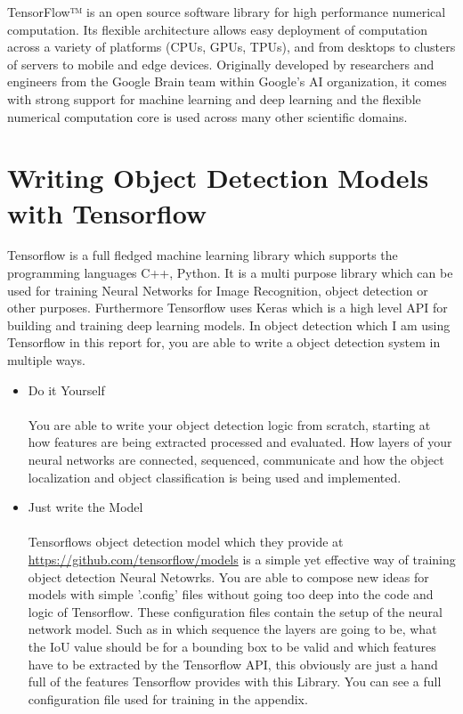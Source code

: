 
TensorFlow™ is an open source software library for high performance numerical computation. Its flexible architecture allows easy deployment
of computation across a variety of platforms (CPUs, GPUs, TPUs), and from desktops to clusters of servers to mobile and edge devices.
Originally developed by researchers and engineers from the Google Brain team within Google’s AI organization, it comes with strong support
for machine learning and deep learning and the flexible numerical computation core is used across many other scientific
domains.\cite{tensorflow}

\section{Writing Object Detection Models with Tensorflow}\label{train-with-tensorflow}
Tensorflow is a full fledged machine learning library which supports the programming languages C++, Python. It is a multi purpose library
which can be used for training Neural Networks for Image Recognition, object detection or other purposes. Furthermore Tensorflow uses
Keras which is a high level API for building and training deep learning models. In object detection which I am using Tensorflow in this
report for, you are able to write a object detection system in multiple ways.
\begin{itemize}
    \item Do it Yourself \\ \\
        You are able to write your object detection logic from scratch, starting at how features are being extracted processed and
        evaluated. How layers of your neural networks are connected, sequenced, communicate and how the object localization and object
        classification is being used and implemented.
    \item Just write the Model \\ \\
        Tensorflows object detection model which they provide at \url{https://github.com/tensorflow/models} is a simple yet effective way of
        training object detection Neural Netowrks. You are able to compose new ideas for models with simple '.config' files without going
        too deep into the code and logic of Tensorflow. These configuration files contain the setup of the neural network model. Such as in
        which sequence the layers are going to be, what the IoU value should be for a bounding box to be valid and which features have to
        be extracted by the Tensorflow API, this obviously are just a hand full of the features Tensorflow provides with this Library.
        You can see a full configuration file used for training in the appendix.
\end{itemize}

